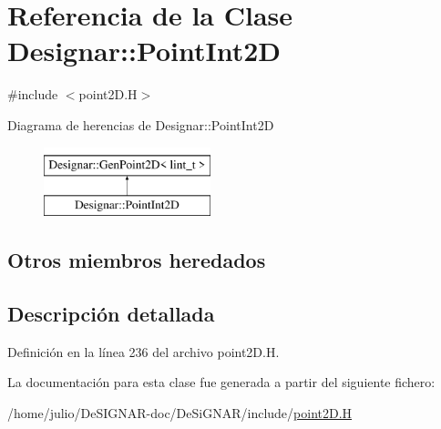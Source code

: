 \hypertarget{class_designar_1_1_point_int2_d}{}\section{Referencia de la Clase Designar\+:\+:Point\+Int2D}
\label{class_designar_1_1_point_int2_d}


{\ttfamily \#include $<$point2\+D.\+H$>$}

Diagrama de herencias de Designar\+:\+:Point\+Int2D\begin{figure}[H]
\begin{center}
\leavevmode
\includegraphics[height=2.000000cm]{class_designar_1_1_point_int2_d}
\end{center}
\end{figure}
\subsection*{Otros miembros heredados}


\subsection{Descripción detallada}


Definición en la línea 236 del archivo point2\+D.\+H.



La documentación para esta clase fue generada a partir del siguiente fichero\+:\begin{DoxyCompactItemize}
\item 
/home/julio/\+De\+S\+I\+G\+N\+A\+R-\/doc/\+De\+Si\+G\+N\+A\+R/include/\hyperlink{point2_d_8_h}{point2\+D.\+H}\end{DoxyCompactItemize}
